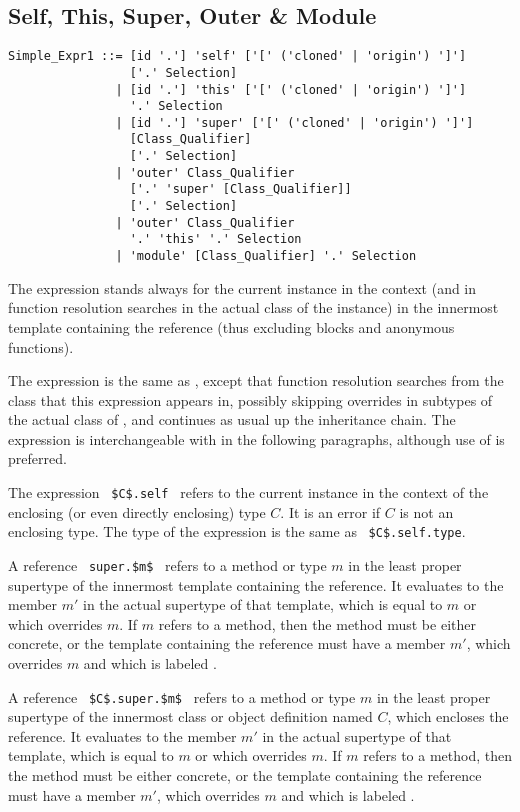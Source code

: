 \subsection{Self, This, Super, Outer \& Module}
\label{sec:self-this-super}

\syntax\begin{lstlisting}
Simple_Expr1 ::= [id '.'] 'self' ['[' ('cloned' | 'origin') ']']
                 ['.' Selection]
               | [id '.'] 'this' ['[' ('cloned' | 'origin') ']']
                 '.' Selection
               | [id '.'] 'super' ['[' ('cloned' | 'origin') ']']
                 [Class_Qualifier] 
                 ['.' Selection]
               | 'outer' Class_Qualifier 
                 ['.' 'super' [Class_Qualifier]] 
                 ['.' Selection]
               | 'outer' Class_Qualifier
                 '.' 'this' '.' Selection
               | 'module' [Class_Qualifier] '.' Selection
\end{lstlisting}

The expression  stands always for the current instance in the context (and in function resolution searches in the actual class of the instance) in the innermost template containing the reference (thus excluding blocks and anonymous functions). 

The expression  is the same as , except that function resolution searches from the class that this expression appears in, possibly skipping overrides in subtypes of the actual class of , and continues as usual up the inheritance chain. The  expression is interchangeable with  in the following paragraphs, although use of  is preferred. 

The expression ~\lstinline!$C$.self!~ refers to the current instance in the context of the enclosing (or even directly enclosing) type $C$. It is an error if $C$ is not an enclosing type. The type of the expression is the same as ~\lstinline!$C$.self.type!. 

A reference ~\lstinline!super.$m$!~ refers to a method or type $m$ in the least proper supertype of the innermost template containing the reference. It evaluates to the member $m'$ in the actual supertype of that template, which is equal to $m$ or which overrides $m$. If $m$ refers to a method, then the method must be either concrete, or the template containing the reference must have a member $m'$, which overrides $m$ and which is labeled . 

A reference ~\lstinline!$C$.super.$m$!~ refers to a method or type $m$ in the least proper supertype of the innermost class or object definition named $C$, which encloses the reference. It evaluates to the member $m'$ in the actual supertype of that template, which is equal to $m$ or which overrides $m$. If $m$ refers to a method, then the method must be either concrete, or the template containing the reference must have a member $m'$, which overrides $m$ and which is labeled . 

